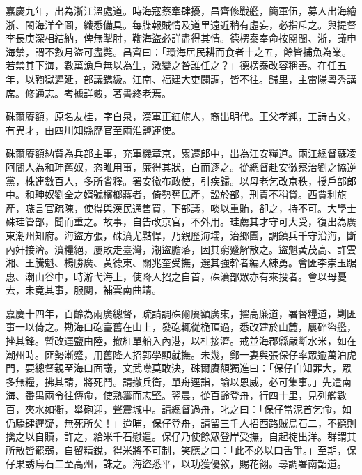 \begin{pinyinscope}
嘉慶九年，出為浙江溫處道。時海寇蔡牽肆擾，昌齊修戰艦，簡軍伍，募人出海繪浙、閩海洋全圖，纖悉備具。每牒報賊情及道里遠近稍有虛妄，必指斥之。與提督李長庚深相結納，俾無掣肘，鞫海盜必詳盡得其情。德楞泰奉命按閱閩、浙，議申海禁，謂不數月盜可盡斃。昌齊曰：「環海居民耕而食者十之五，餘皆捕魚為業。若禁其下海，數萬漁戶無以為生，激變之咎誰任之？」德楞泰改容稱善。在任五年，以鞫獄遲延，部議鐫級。江南、福建大吏闢調，皆不往。歸里，主雷陽粵秀講席。修通志。考據詳覈，著書終老焉。

硃爾賡額，原名友桂，字白泉，漢軍正紅旗人，裔出明代。王父孝純，工詩古文，有異才，由四川知縣歷官至兩淮鹽運使。

硃爾賡額納貲為兵部主事，充軍機章京，累遷郎中，出為江安糧道。兩江總督蘇凌阿閽人為和珅舊奴，恣睢用事，廉得其狀，白而逐之。從總督赴安徽察治劉之協逆黨，株連數百人，多所省釋。署安徽布政使，引疾歸。以母老乞改京秩，授戶部郎中。和珅奴劉全之婿號檳榔蔣者，倚勢奪民產，訟於部，刑責不稍貸。西賈利旗產，嗾言官疏陳，使得與漢民通售買，下部議，啖以重賄，卻之，持不可。大學士硃珪管部，聞而重之。故事，自告改京官，不外用。珪薦其才守可大受，復出為廣東潮州知府。海盜方張，硃濆尤黠悍，乃親歷海壖，治鄉團，調鎮兵千守沿海，斷內奸接濟。濆糧絕，屢敗走臺灣，潮盜膽落，因其窮蹙解散之。盜魁黃茂高、許雲湘、王騰魁、楊勝廣、黃德東、關兆奎受撫，選其強幹者編入練勇。會匪李崇玉踞惠、潮山谷中，時游弋海上，使降人招之自首，硃濆部眾亦有來投者。會以母憂去，未竟其事，服闋，補雲南曲靖。

嘉慶十四年，百齡為兩廣總督，疏請調硃爾賡額廣東，擢高廉道，署督糧道，剿匪事一以倚之。勘海口砲臺舊在山上，發砲輒從桅頂過，悉改建於山麓，屢碎盜艦，挫其鋒。暫改運鹽由陸，撤紅單船入內港，以杜接濟。戒並海郡縣嚴斷水米，如在潮州時。匪勢漸蹙，用舊降人招郭學顯就撫。未幾，鄭一妻與張保仔率眾逾萬泊虎門，要總督親至海口面議，文武噤莫敢決，硃爾賡額獨進曰：「保仔自知罪大，眾多無糧，拂其請，將死鬥。請撤兵衛，單舟逕詣，諭以恩威，必可集事。」先遣南海、番禺兩令往傳命，使熟籌而志堅。翌晨，從百齡登舟，行四十里，見列艦數百，夾水如衢，舉砲迎，聲震城中。請總督過舟，叱之曰：「保仔當泥首乞命，如仍驕肆遲疑，無死所矣！」迨晡，保仔登舟，請留三千人招西路賊烏石二，不聽則擒之以自贖，許之，給米千石慰遣。保仔乃使餘眾登岸受撫，自起椗出洋。群謂其所散皆罷弱，自留精銳，得米將不可制，笑應之曰：「此不必以口舌爭。」至期，保仔果誘烏石二至高州，誅之。海盜悉平，以功獲優敘，賜花翎。尋調署南韶道。


\end{pinyinscope}
